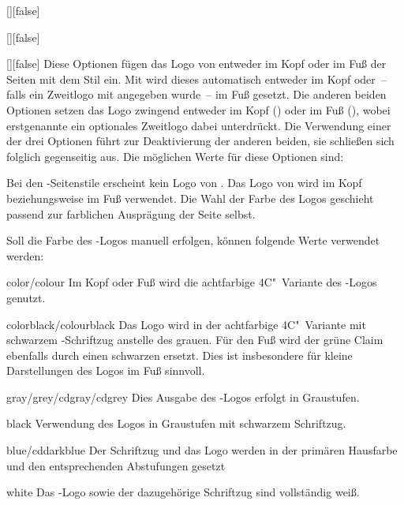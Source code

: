 \begin{Declaration}{[\PSet]}[false]
\begin{Declaration}[v2.02]{[\PSet]}[false]
\begin{Declaration}{[\PSet]}[false]
\printdeclarationlist%
%
%
Diese Optionen fügen das Logo von \DDC entweder im Kopf oder im Fuß der Seiten
mit dem Stil  ein. Mit  wird dieses 
automatisch entweder im Kopf oder~-- falls ein Zweitlogo mit  
angegeben wurde~-- im Fuß gesetzt. Die anderen beiden Optionen setzen das Logo 
zwingend entweder im Kopf () oder im Fuß (), 
wobei erstgenannte ein optionales Zweitlogo dabei unterdrückt. Die Verwendung 
einer der drei Optionen führt zur Deaktivierung der anderen beiden, sie 
schließen sich folglich gegenseitig aus. Die möglichen Werte für diese Optionen 
sind:
%
\begin{values}
\itemfalse
  Bei den -Seitenstile erscheint kein Logo von \DDC.
\itemtrue*
  Das Logo von \DDC wird im Kopf beziehungsweise im Fuß verwendet. Die Wahl der 
  Farbe des Logos geschieht passend zur farblichen Ausprägung der Seite selbst.
\end{values}
%
Soll die Farbe des \DDC-Logos manuell erfolgen, können folgende Werte verwendet 
werden:
%
\begin{values}
\item[color/colour]
  Im Kopf oder Fuß wird die achtfarbige 4C"~Variante des \DDC-Logos genutzt.
\item[colorblack/colourblack]
  Das Logo wird in der achtfarbige 4C"~Variante mit schwarzem \DDC-Schriftzug 
  anstelle des grauen. Für den Fuß wird der grüne Claim ebenfalls durch einen 
  schwarzen ersetzt. Dies ist insbesondere für kleine Darstellungen des Logos 
  im Fuß sinnvoll.
\item[gray/grey/cdgray/cdgrey]
  Dies Ausgabe des \DDC-Logos erfolgt in Graustufen.
\item[black]
  Verwendung des Logos in Graustufen mit schwarzem Schriftzug.
\item[blue/cddarkblue]
  Der Schriftzug und das Logo werden in der primären Hausfarbe  
  und den entsprechenden Abstufungen gesetzt
\item[white]
  Das \DDC-Logo sowie der dazugehörige Schriftzug sind vollständig weiß.
\end{values}
%
\end{Declaration}
\end{Declaration}
\end{Declaration}

